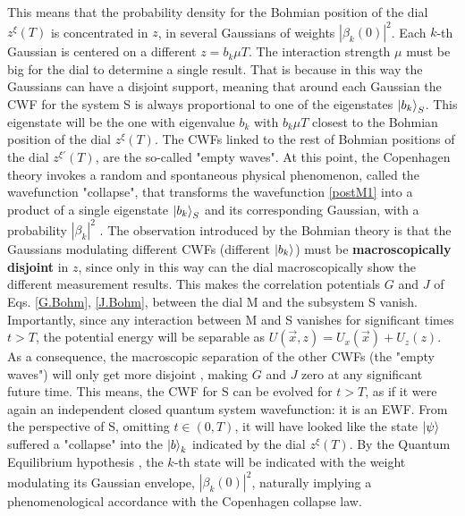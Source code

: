 \documentclass[11pt, a4paper]{article} %
\begin{document}
This means that the probability density for the Bohmian position of the dial $z^\xi(T)$ is concentrated in $z$, in several Gaussians of weights $|\beta_k(0)|^2$. Each $k$-th Gaussian is centered on a different $z=b_k \mu T$. The interaction strength $\mu$ must be big for the dial to determine a single result. That is because in this way the Gaussians can have a disjoint support, meaning that around each Gaussian the CWF for the system S is always proportional to one of the eigenstates $\ket{b_k}_S$. This eigenstate will be the one with eigenvalue $b_k$ with $b_k\mu T$ closest to the Bohmian position of the dial $z^\xi(T)$. The CWFs linked to the rest of Bohmian positions of the dial $z^{\xi'}(T)$, are the so-called "empty waves". At this point, the Copenhagen theory invokes a random and spontaneous physical phenomenon, called the wavefunction "collapse", that transforms the wavefunction \eqref{postM1} into a product of a single eigenstate $\ket{b_k}_S$ and its corresponding Gaussian, with a probability $|\beta_k|^2$ \cite{vonNeumann}. The observation introduced by the Bohmian theory is that the Gaussians modulating different CWFs (different $\ket{b_k}$) must be {\bf macroscopically disjoint} in $z$, since only in this way can the dial macroscopically show the different measurement results. This makes the correlation potentials $G$ and $J$ of Eqs. \eqref{G.Bohm}, \eqref{J.Bohm}, between the dial M and the subsystem S vanish. Importantly, since any interaction between M and S vanishes for significant times $t>T$, the potential energy will be separable as $U(\vec{x},z)=U_x(\vec{x})+U_z(z)$. As a consequence, the macroscopic separation of the other CWFs (the "empty waves") will only get more disjoint \cite{Absolute}, making $G$ and $J$ zero at any significant future time. This means, the CWF for S can be evolved for $t>T$, as if it were again an independent closed quantum system wavefunction: it is an EWF. From the perspective of S, omitting $t\in(0,T)$, it will have looked like the state $\ket{\psi}$ suffered a "collapse" into the $\ket{b}_k$ indicated by the dial $z^\xi(T)$. By the Quantum Equilibrium hypothesis \cite{Absolute}, the $k$-th state will be indicated with the weight modulating its Gaussian envelope, $|\beta_k(0)|^2$, naturally implying a phenomenological accordance with the Copenhagen collapse law.
\end{document}
